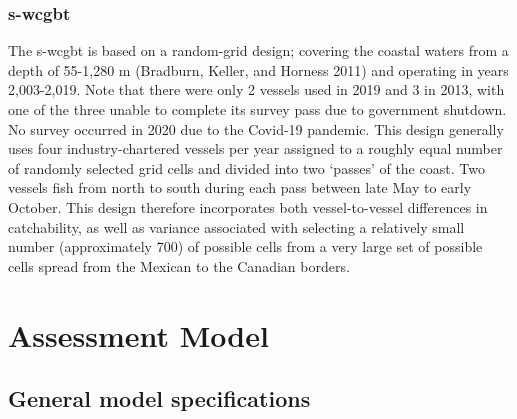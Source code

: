 \documentclass[11pt,
  english,
  a4paper,
]{article}
\begin{document}
\leavevmode\tagmcend\tagstructend\par


\hypertarget{section-2}{%
\subsubsection{\texorpdfstring{\acrlong{s-wcgbt}}{}}\label{section-2}}

\leavevmode\tagmcend\tagstructend


The \Gls{s-wcgbt} is based on a random-grid design; covering the coastal waters from a depth of 55-1,280 m {(Bradburn, Keller, and Horness 2011)\leavevmode\tagmcend\tagstructend} and operating in years 2,003-2,019. Note that there were only 2 vessels used in 2019 and 3 in 2013, with one of the three unable to complete its survey pass due to government shutdown. No survey occurred in 2020 due to the Covid-19 pandemic. This design generally uses four industry-chartered vessels per year assigned to a roughly equal number of randomly selected grid cells and divided into two `passes' of the coast. Two vessels fish from north to south during each pass between late May to early October. This design therefore incorporates both vessel-to-vessel differences in catchability, as well as variance associated with selecting a relatively small number (approximately 700) of possible cells from a very large set of possible cells spread from the Mexican to the Canadian borders.

\leavevmode\tagmcend\tagstructend\par


\hypertarget{assessment-model}{%
\section{Assessment Model}\label{assessment-model}}

\leavevmode\tagmcend\tagstructend


\hypertarget{general-model-specifications}{%
\subsection{General model specifications}\label{general-model-specifications}}
\end{document}
